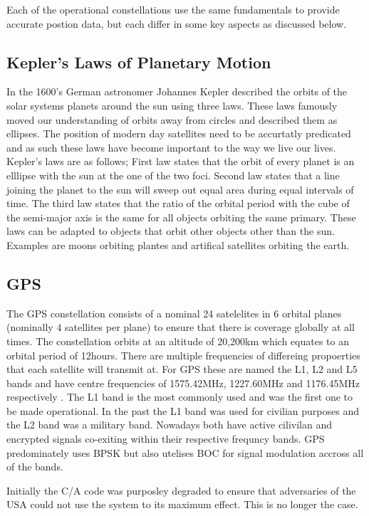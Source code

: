 Each of the operational constellations use the same fundamentals to provide accurate postion data, but each differ in some key aspects as discussed below.

\subsection{Kepler's Laws of Planetary Motion} \label{subsec: OrbitalMechanics}
In the 1600's German astronomer Johannes Kepler described the orbits of the solar systems planets around the sun using three laws. 
These laws famously moved our understanding of orbits away from circles and described them as ellipses. The position of modern day satellites need to be accurtatly
predicated and as such these laws have become important to the way we live our lives. Kepler's laws are as follows; First law states that the orbit of every planet is an
elllipse with the sun at the one of the two foci. Second law states that a line joining the planet to the sun will sweep out equal area during equal intervals of time.
The third law states that the ratio of the orbital period with the cube of the semi-major axis is the same for all objects orbiting the same primary. These laws can be
adapted to objects that orbit other objects other than the sun. Examples are moons orbiting plantes and artifical satellites orbiting the earth.

\subsection{GPS} \label{subsec:GNSS_GPSIntro}
The GPS constellation consists of a nominal 24 satelelites in 6 orbital planes (nominally 4 satellites per plane) to ensure that there is coverage globally at all times.
The constellation orbits at an altitude of 20,200km which equates to an orbital period of 12hours.
There are multiple frequencies of differeing propoerties that each satellite will transmit at. For GPS these are named the L1, L2 and L5 bands and have centre frequencies
of 1575.42MHz, 1227.60MHz and 1176.45MHz respectively \cite{RN49}. The L1 band is the most commonly used and was the first one to be made operational. In the past the L1
band was used for civilian purposes and the L2 band was a military band. Nowadays both have active cilivilan and encrypted signals co-exiting within their respective
frequncy bands. GPS predominately uses BPSK but also utelises BOC for signal modulation accross all of the bands.  

Initially the C/A code was purposley degraded to ensure that adversaries of the USA could not use the system to its maximum effect. This is no longer the case.

